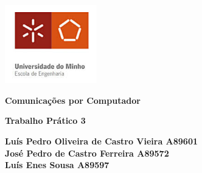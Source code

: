 \documentclass[11pt]{article}
\begin{document}
\begin{titlepage}
    \begin{center}
        \includegraphics[width=0.3\textwidth]{images/capa/EscolaEngenhariaUM.jpeg}
    
        \vspace{1cm}
        
        \textbf{\LARGE Comunicações por Computador}
    
        \vspace{0.5cm}
        \textbf{\Large Trabalho Prático 3}

        \vspace{1.3cm}
        
        \textbf{\large Luís Pedro Oliveira de Castro Vieira A89601 \\
        José Pedro de Castro Ferreira A89572 \\
        Luís Enes Sousa A89597}


\end{center}
\end{titlepage}
\end{document}
